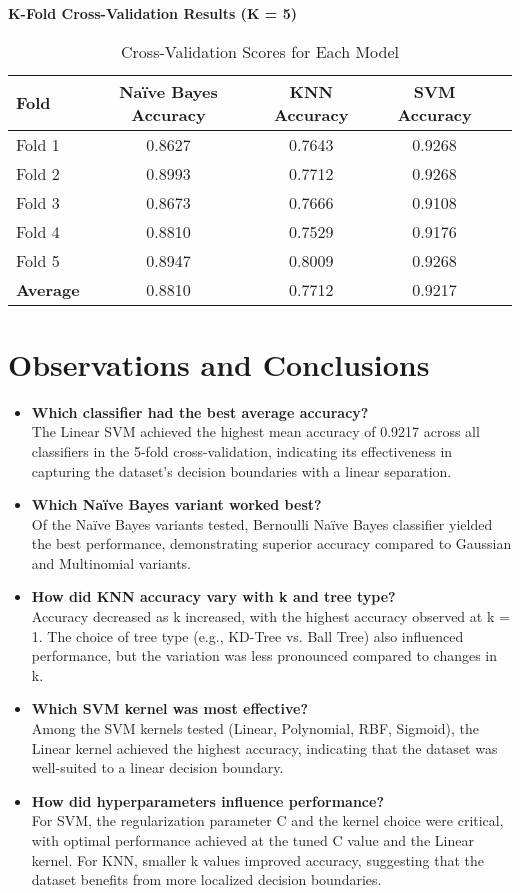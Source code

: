 \documentclass[11pt]{article}
\begin{document}
\vspace{1cm}
\noindent
\textbf{K-Fold Cross-Validation Results (K = 5)} \\
\begin{table}[h!]
\centering
\begin{tabular}{|l|c|c|c|c|}
\hline
\textbf{Fold} & \textbf{Naïve Bayes Accuracy} & \textbf{KNN Accuracy} & \textbf{SVM Accuracy}\\
\hline
Fold 1 & 0.8627 & 0.7643 & 0.9268\\
Fold 2 & 0.8993 & 0.7712 & 0.9268\\
Fold 3 & 0.8673 & 0.7666 & 0.9108\\
Fold 4 & 0.8810 & 0.7529 & 0.9176\\
Fold 5 & 0.8947 & 0.8009 & 0.9268\\
\hline
\textbf{Average} & 0.8810 & 0.7712 & 0.9217\\
\hline
\end{tabular}
\caption{Cross-Validation Scores for Each Model}
\end{table}

\vspace{1cm}
\section{Observations and Conclusions}
\begin{itemize}
    \item \textbf{Which classifier had the best average accuracy?}
\\The Linear SVM achieved the highest mean accuracy of 0.9217 across all classifiers in the 5-fold cross-validation, indicating its effectiveness in capturing the dataset’s decision boundaries with a linear separation.
    \item \textbf{Which Naïve Bayes variant worked best?}
    \\Of the Naïve Bayes variants tested, Bernoulli Naïve Bayes classifier yielded the best performance, demonstrating superior accuracy compared to Gaussian and Multinomial variants.
    \item \textbf{How did KNN accuracy vary with k and tree type?}
    \\Accuracy decreased as k increased, with the highest accuracy observed at k = 1. The choice of tree type (e.g., KD-Tree vs. Ball Tree) also influenced performance, but the variation was less pronounced compared to changes in k.
    \item \textbf{Which SVM kernel was most effective?}
    \\Among the SVM kernels tested (Linear, Polynomial, RBF, Sigmoid), the Linear kernel achieved the highest accuracy, indicating that the dataset was well-suited to a linear decision boundary.
    \item \textbf{How did hyperparameters influence performance?}
    \\For SVM, the regularization parameter C and the kernel choice were critical, with optimal performance achieved at the tuned C value and the Linear kernel. For KNN, smaller k values improved accuracy, suggesting that the dataset benefits from more localized decision boundaries. 
\end{itemize}
\end{document}
